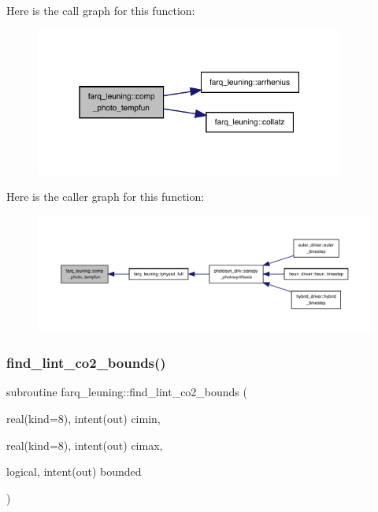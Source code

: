 Here is the call graph for this function\+:
\nopagebreak
\begin{figure}[H]
\begin{center}
\leavevmode
\includegraphics[width=289pt]{namespacefarq__leuning_a9b3b89dd90573241f7a95685e0c416f6_cgraph}
\end{center}
\end{figure}
Here is the caller graph for this function\+:
\nopagebreak
\begin{figure}[H]
\begin{center}
\leavevmode
\includegraphics[width=350pt]{namespacefarq__leuning_a9b3b89dd90573241f7a95685e0c416f6_icgraph}
\end{center}
\end{figure}
\mbox{\label{namespacefarq__leuning_a7f904e78bc57baa0ad78b38d7455e710}} 
\subsubsection{\texorpdfstring{find\+\_\+lint\+\_\+co2\+\_\+bounds()}{find\_lint\_co2\_bounds()}}
{\footnotesize\ttfamily subroutine farq\+\_\+leuning\+::find\+\_\+lint\+\_\+co2\+\_\+bounds (\begin{DoxyParamCaption}\item[{real(kind=8), intent(out)}]{cimin,  }\item[{real(kind=8), intent(out)}]{cimax,  }\item[{logical, intent(out)}]{bounded }\end{DoxyParamCaption})}

